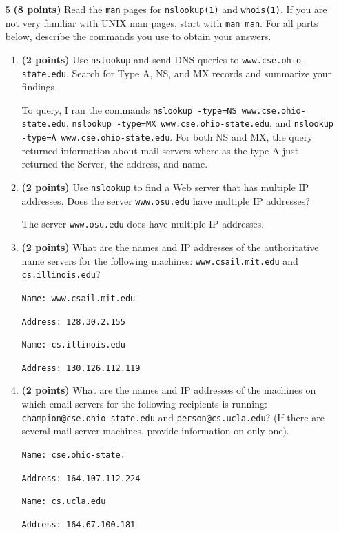 \documentclass{article}
\begin{document}
\begin{enumerate}
\item[5]\textbf{(8 points)} Read the \texttt{man} pages for \texttt{nslookup(1)} and \texttt{whois(1)}. If you are not very familiar with UNIX man pages, start with \texttt{man man}. For all parts below, describe the commands you use to obtain your answers.

\begin{enumerate}
\item \textbf{(2 points)} Use \texttt{nslookup} and send DNS queries to \texttt{www.cse.ohio-state.edu}. Search for Type A, NS, and MX records and summarize your findings.

To query, I ran the commands \texttt{nslookup -type=NS www.cse.ohio-state.edu}, \texttt{nslookup -type=MX www.cse.ohio-state.edu}, and \texttt{nslookup -type=A www.cse.ohio-state.edu}. For both NS and MX, the query returned information about mail servers where as the type A just returned the Server, the address, and name.

\item \textbf{(2 points)} Use \texttt{nslookup} to find a Web server that has multiple IP addresses. Does the server \texttt{www.osu.edu} have multiple IP addresses?

The server \texttt{www.osu.edu} does have multiple IP addresses.

\item \textbf{(2 points)} What are the names and IP addresses of the authoritative name servers for the following machines: \texttt{www.csail.mit.edu} and \texttt{cs.illinois.edu}?

\texttt{Name: www.csail.mit.edu}

\texttt{Address: 128.30.2.155}

\texttt{Name: cs.illinois.edu}

\texttt{Address: 130.126.112.119}

\item \textbf{(2 points)} What are the names and IP addresses of the machines on which email servers for the following recipients is running: \texttt{champion@cse.ohio-state.edu} and \texttt{person@cs.ucla.edu}? (If there are several mail server machines, provide information on only one).

\texttt{Name: cse.ohio-state.}

\texttt{Address: 164.107.112.224}


\texttt{Name: cs.ucla.edu}

\texttt{Address: 164.67.100.181}


\end{enumerate}


\end{enumerate}
\end{document}
